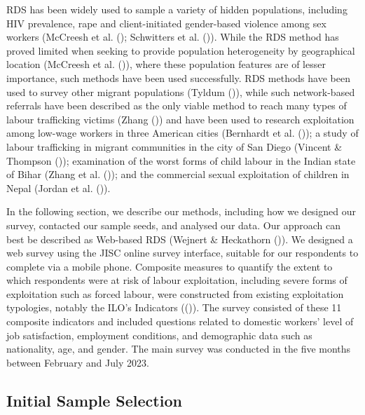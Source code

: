 \documentclass[
  12pt,
]{article}
\theoremstyle{plain}
\theoremstyle{definition}
\begin{document}
RDS has been widely used to sample a variety of hidden populations,
including HIV prevalence, rape and client-initiated gender-based
violence among sex workers (McCreesh et al.
(); Schwitters et al.
()). While the RDS method
has proved limited when seeking to provide population heterogeneity by
geographical location (McCreesh et al.
()), where these population
features are of lesser importance, such methods have been used
successfully. RDS methods have been used to survey other migrant
populations (Tyldum ()), while
such network-based referrals have been described as the only viable
method to reach many types of labour trafficking victims (Zhang
()) and have been used to
research exploitation among low-wage workers in three American cities
(Bernhardt et al. ()); a study
of labour trafficking in migrant communities in the city of San Diego
(Vincent \& Thompson ());
examination of the worst forms of child labour in the Indian state of
Bihar (Zhang et al. ()); and the
commercial sexual exploitation of children in Nepal (Jordan et al.
()).

In the following section, we describe our methods, including how we
designed our survey, contacted our sample seeds, and analysed our data.
Our approach can best be described as Web-based RDS (Wejnert \&
Heckathorn ()). We designed a
web survey using the JISC online survey interface, suitable for our
respondents to complete via a mobile phone. Composite measures to
quantify the extent to which respondents were at risk of labour
exploitation, including severe forms of exploitation such as forced
labour, were constructed from existing exploitation typologies, notably
the ILO's Indicators (()).
The survey consisted of these 11 composite indicators and included
questions related to domestic workers' level of job satisfaction,
employment conditions, and demographic data such as nationality, age,
and gender. The main survey was conducted in the five months between
February and July 2023.

\subsection{Initial Sample Selection}\label{initial-sample-selection}
\end{document}
